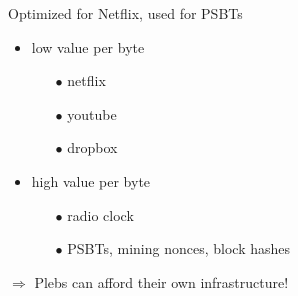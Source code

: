 \documentclass{beamer}
\begin{document}
\begin{frame}{Optimized for Netflix, used for PSBTs}
\begin{minipage}[t]{0.5\textwidth}
\end{minipage}%
\begin{minipage}[t]{0.5\textwidth} %
    \small %
    \setlength{\parskip}{6pt} %

    \begin{itemize}
    \item low value per byte
    \begin{itemize}
        \item[$\bullet$] netflix
        \item[$\bullet$] youtube
        \item[$\bullet$] dropbox
    \end{itemize}

    \item high value per byte
    \begin{itemize}
        \item[$\bullet$] radio clock
        \item[$\bullet$] PSBTs, mining nonces, block hashes
    \end{itemize}
    \end{itemize}

$\Rightarrow$ Plebs can afford their own infrastructure!


\end{minipage}%
\end{frame}
\end{document}
